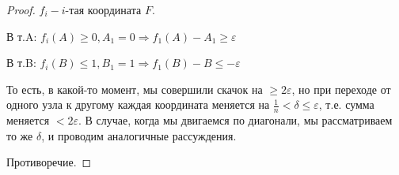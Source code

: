 \documentclass{article}
\begin{document}
\begin{proof}
$f_i - i$-тая координата $F$.

В т.A: $f_i(A) \geq 0, A_1 = 0 \Rightarrow f_1(A) - A_1 \geq \varepsilon$

В т.B: $f_i(B) \leq 1, B_1 = 1 \Rightarrow f_1(B) - B \leq - \varepsilon$

То есть, в какой-то момент, мы совершили скачок на $\geq 2\varepsilon$, но при переходе от одного узла к другому каждая координата меняется на $\frac{1} {n} < \delta \leq \varepsilon$, т.е. сумма меняется $ < 2\varepsilon$.
В случае, когда мы двигаемся по диагонали, мы рассматриваем то же $\delta$, и проводим аналогичные рассуждения.

Противоречие.

\end{proof}
\end{document}
